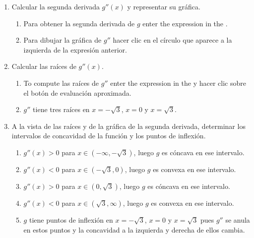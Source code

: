 \begin{enumerate}[leftmargin=*]
\begin{enumerate}
      \item Calcular la segunda derivada $g''(x)$ y representar su gráfica.
            \begin{indication}
            \begin{enumerate}
            \item Para obtener la segunda derivada de $g$ enter the expression  in the .
            \item Para dibujar la gráfica de $g''$ hacer clic en el círculo que aparece a la izquierda de la expresión anterior.
            \end{enumerate}
            \end{indication}

      \item Calcular las raíces de $g''(x).$
            \begin{indication}
            \begin{enumerate}
            \item To compute las raíces de $g''$ enter the expression  in the  y hacer clic sobre el botón de evaluación aproximada.
            \item $g''$ tiene tres raíces en $x=-\sqrt{3}$, $x=0$ y $x=\sqrt{3}$.
            \end{enumerate}
            \end{indication}

      \item A la vista de las raíces y de la gráfica de la segunda derivada, determinar los intervalos de concavidad de la función y los puntos de inflexión.
            \begin{indication}
            \begin{enumerate}
            \item $g''(x)>0$ para $x\in (-\infty, -\sqrt{3})$, luego $g$ es cóncava en ese intervalo.
            \item $g''(x)<0$ para $x\in (-\sqrt{3}, 0)$, luego $g$ es convexa en ese intervalo.
            \item $g''(x)>0$ para $x\in (0, \sqrt{3})$, luego $g$ es cóncava en ese intervalo.
            \item $g''(x)<0$ para $x\in (\sqrt{3}, \infty)$, luego $g$ es convexa en ese intervalo.
            \item $g$ tiene puntos de inflexión en $x=-\sqrt{3}$, $x=0$ y $x=\sqrt{3}$ pues $g''$ se anula en estos puntos y la concavidad a la izquierda y derecha de ellos cambia.
            \end{enumerate}
            \end{indication}
      \end{enumerate}

\end{enumerate}



